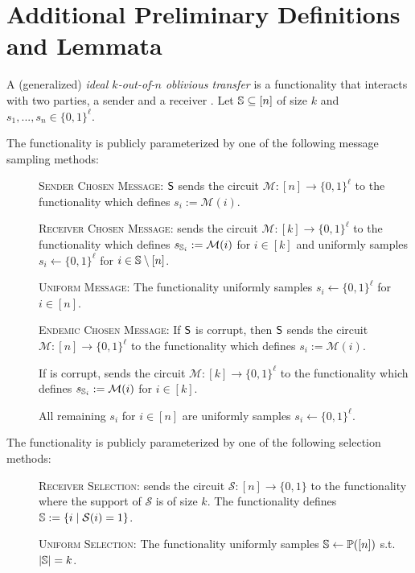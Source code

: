 \section{Additional Preliminary Definitions and Lemmata}\label{sec:defsandlems}


\begin{definition}\label{def:got}
	A (generalized) \emph{ideal $k$-out-of-$n$ oblivious transfer} is a functionality that interacts with two parties, a sender \send and a receiver \rec. Let $\mathsf{\mathbb S}\subseteq[n]$ of size $k$ and  $s_1,...,s_n\in \{0,1\}^\ell$.
	
	The functionality is publicly parameterized by one of the following message sampling methods:
	\begin{description}
		\item[] \textsc{Sender Chosen Message:} $\mathsf{S}$ sends the circuit $\mathcal{M} : [n] \rightarrow \{0,1\}^\ell$ to the functionality which defines $s_i:=\mathcal{M}(i)$.
		
		\item[] \textsc{Receiver Chosen Message:} \rec sends the circuit  $\mathcal{M} : [k] \rightarrow \{0,1\}^\ell$ to the functionality which defines $s_{\mathsf{\mathbb S}_i}:=\mathcal{M}(i)$ for $i\in[k]$ and uniformly samples $s_i\gets\{0,1\}^\ell$ for $i\in\mathsf{\mathbb S}\setminus[n]$.
		
		\item[] \textsc{Uniform Message:} The functionality uniformly samples $s_i\gets\{0,1\}^{\ell}$ for $i\in[n]$. 
		
		\item[] \textsc{Endemic Chosen Message:} If $\mathsf{S}$ is corrupt, then $\mathsf{S}$ sends the circuit $\mathcal{M} : [n] \rightarrow \{0,1\}^\ell$ to the functionality which defines $s_i:=\mathcal{M}(i)$.
		
		If \rec is corrupt, \rec sends the circuit  $\mathcal{M} : [k] \rightarrow \{0,1\}^\ell$ to the functionality which defines $s_{\mathsf{\mathbb S}_i}:=\mathcal{M}(i)$ for $i\in[k]$.
		
		All remaining $s_i$ for $i\in [n]$ are uniformly samples $s_i\gets\{0,1\}^\ell$.
	\end{description}
	
	The functionality is publicly parameterized by one of the following selection methods:
	\begin{description}
		\item[] \textsc{Receiver Selection:} \rec sends the circuit $\mathcal{S}:[n]\rightarrow\{0,1\}$ to the functionality where the support of $\mathcal{S}$ is of size $k$. The functionality defines $\mathsf{\mathbb S}:=\{i \mid \mathcal{S}(i)=1\}$.
		\item[] \textsc{Uniform Selection:} The functionality uniformly samples $\mathsf{\mathbb S}\gets\mathbb{P}([n])$ s.t. $|\mathsf{\mathbb S}|=k$.
	\end{description}
	

\end{definition}
